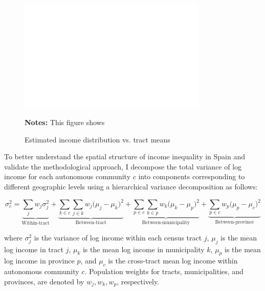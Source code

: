 \begin{figure}[H]
\begin{center}
\captionsetup{justification=centering}
\caption{Estimated income distribution vs. tract means}
\label{fig:distributions}
\includegraphics[width=0.8\textwidth]{output/tract_vs_national_income_distribution.png}
\end{center}
\begin{fignotes2}
\textbf{Notes:} This figure shows 
\end{fignotes2}
\end{figure}







To better understand the spatial structure of income inequality in Spain and validate the methodological approach, I decompose the total variance of log income for each autonomous community $c$ into components corresponding to different geographic levels using a hierarchical variance decomposition as follows:

\begin{equation}
\sigma^2_{c} = 
\underbrace{\sum_{j} w_j \sigma^2_{j}}_{\text{Within-tract}} + 
\underbrace{\sum_{k \in c} \sum_{j \in k} w_j \big( \mu_{j} - \mu_{k} \big)^2}_{\text{Between-tract}} + 
\underbrace{\sum_{p \in c} \sum_{k \in p} w_k \big( \mu_{k} - \mu_{p} \big)^2}_{\text{Between-municipality}} + 
\underbrace{\sum_{p \in c} w_p \big( \mu_{p} - \mu_{c} \big)^2}_{\text{Between-province}}
\end{equation}

where $\sigma^2_{j}$ is the variance of log income within each census tract $j$, $\mu_j$ is the mean log income in tract $j$, $\mu_k$ is the mean log income in municipality $k$, $\mu_p$ is the mean log income in province $p$, and  $\mu_{c}$ is the cross-tract mean log income within autonomous community $c$. Population weights for tracts, municipalities, and provinces, are denoted by $w_j, w_k, w_p$, respectively.

